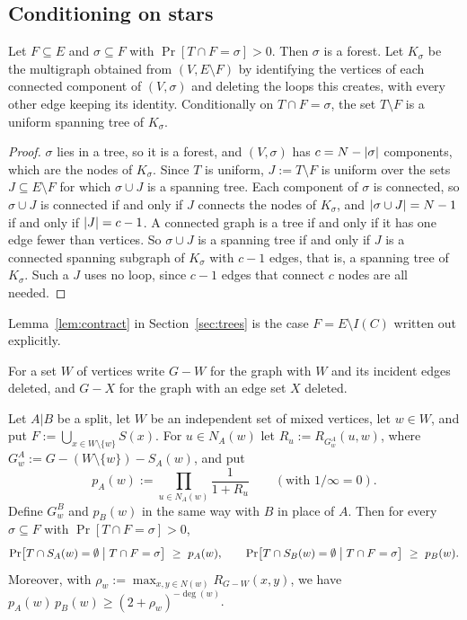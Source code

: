 \subsection{Conditioning on stars}

\begin{lemma}\label{lem:markov}
Let $F\subseteq E$ and $\sigma\subseteq F$ with $\Pr[T\cap F=\sigma]>0$. Then $\sigma$ is a forest. Let $K_\sigma$ be the multigraph obtained from $(V,E\setminus F)$ by identifying the vertices of each connected component of $(V,\sigma)$ and deleting the loops this creates, with every other edge keeping its identity. Conditionally on $T\cap F=\sigma$, the set $T\setminus F$ is a uniform spanning tree of $K_\sigma$.
\end{lemma}

\begin{proof}
$\sigma$ lies in a tree, so it is a forest, and $(V,\sigma)$ has $c=N-\lvert \sigma\rvert$ components, which are the nodes of $K_\sigma$. Since $T$ is uniform, $J:=T\setminus F$ is uniform over the sets $J\subseteq E\setminus F$ for which $\sigma\cup J$ is a spanning tree. Each component of $\sigma$ is connected, so $\sigma\cup J$ is connected if and only if $J$ connects the nodes of $K_\sigma$, and $\lvert \sigma\cup J\rvert=N-1$ if and only if $\lvert J\rvert=c-1$. A connected graph is a tree if and only if it has one edge fewer than vertices. So $\sigma\cup J$ is a spanning tree if and only if $J$ is a connected spanning subgraph of $K_\sigma$ with $c-1$ edges, that is, a spanning tree of $K_\sigma$. Such a $J$ uses no loop, since $c-1$ edges that connect $c$ nodes are all needed.
\end{proof}

Lemma~\ref{lem:contract} in Section~\ref{sec:trees} is the case $F=E\setminus I(C)$ written out explicitly.

For a set $W$ of vertices write $G-W$ for the graph with $W$ and its incident edges deleted, and $G-X$ for the graph with an edge set $X$ deleted.

\begin{lemma}\label{lem:touch}
Let $A|B$ be a split, let $W$ be an independent set of mixed vertices, let $w\in W$, and put $F:=\bigcup_{x\in W\setminus\{w\}}S(x)$. For $u\in N_A(w)$ let $R_u:=R_{G_w^A}(u,w)$, where $G_w^A:=G-(W\setminus\{w\})-S_A(w)$, and put
\[
  p_A(w):=\prod_{u\in N_A(w)}\frac1{1+R_u}\qquad(\text{with }1/\infty=0).
\]
Define $G_w^B$ and $p_B(w)$ in the same way with $B$ in place of $A$. Then for every $\sigma\subseteq F$ with $\Pr[T\cap F=\sigma]>0$,
\[
  \Pr\bigl[T\cap S_A(w)=\emptyset\bigm|T\cap F=\sigma\bigr]\ \ge\ p_A(w),\qquad\Pr\bigl[T\cap S_B(w)=\emptyset\bigm|T\cap F=\sigma\bigr]\ \ge\ p_B(w).
\]
Moreover, with $\rho_w:=\max_{x,y\in N(w)}R_{G-W}(x,y)$, we have $p_A(w)\,p_B(w)\ge(2+\rho_w)^{-\deg(w)}$.
\end{lemma}

